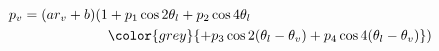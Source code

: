 \begin{align}
p_v=(ar_v+b)(1 &+ p_1\cos 2\theta_l + p_2\cos 4\theta_l \\
                & \color{grey}{+p_3\cos 2(\theta_l-\theta_v) + p_4\cos 4(\theta_l-\theta_v)})
\end{align}

